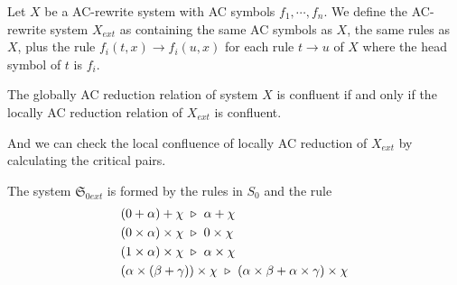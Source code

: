 \begin{definition}
  Let $X$ be a AC-rewrite system with AC symbols $f_1, \cdots, f_n$. We define the AC-rewrite system $X_{ext}$ as containing the same AC symbols as $X$, the same rules as $X$, plus the rule $f_i(t, x) \to f_i(u, x)$ for each rule $t \to u$ of $X$ where the head symbol of $t$ is $f_i$.
\end{definition}

\begin{proposition}
  The globally AC reduction relation of system $X$ is confluent if and only if the locally AC reduction relation of $X_{ext}$ is confluent.
\end{proposition}

And we can check the local confluence of locally AC reduction of $X_{ext}$ by calculating the critical pairs.

\begin{proposition}
  The system $\mathfrak{S}_{0ext}$ is formed by the rules in $S_0$ and the rule
  \begin{align*}
    & (0 + \alpha) + \chi \ \triangleright\  \alpha + \chi \\
    & (0 \times \alpha) \times \chi \ \triangleright\  0 \times \chi \\
    & (1 \times \alpha) \times \chi \ \triangleright\  \alpha \times \chi \\
    & (\alpha \times (\beta + \gamma)) \times \chi \ \triangleright\  (\alpha \times \beta + \alpha \times \gamma) \times \chi \\
  \end{align*}
\end{proposition}


